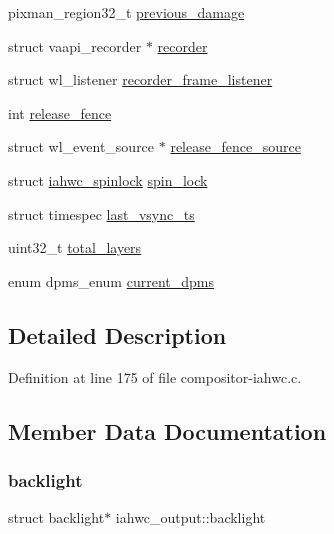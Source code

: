 \begin{DoxyCompactItemize}
\item 
pixman\+\_\+region32\+\_\+t \mbox{\hyperlink{structiahwc__output_a853f609b7a945b51ced6349755d9261c}{previous\+\_\+damage}}
\item 
struct vaapi\+\_\+recorder $\ast$ \mbox{\hyperlink{structiahwc__output_a3fe7dd1b11d07065ec10a0066bad6b0b}{recorder}}
\item 
struct wl\+\_\+listener \mbox{\hyperlink{structiahwc__output_a8d3cfee58372ebf417ed0e6b8ef08db1}{recorder\+\_\+frame\+\_\+listener}}
\item 
int \mbox{\hyperlink{structiahwc__output_a3137bfd94446ab2ee1cc823575894b2a}{release\+\_\+fence}}
\item 
struct wl\+\_\+event\+\_\+source $\ast$ \mbox{\hyperlink{structiahwc__output_a34dcb2b1a9089f0dcc5f36afb845e399}{release\+\_\+fence\+\_\+source}}
\item 
struct \mbox{\hyperlink{structiahwc__spinlock}{iahwc\+\_\+spinlock}} \mbox{\hyperlink{structiahwc__output_a4ba268dca4916063188a7ba33f2123cd}{spin\+\_\+lock}}
\item 
struct timespec \mbox{\hyperlink{structiahwc__output_aeb2dda1bb8a7ef76b2be89b059f3d524}{last\+\_\+vsync\+\_\+ts}}
\item 
uint32\+\_\+t \mbox{\hyperlink{structiahwc__output_a62bb8c46afae61d108af6c2f17cd6ff5}{total\+\_\+layers}}
\item 
enum dpms\+\_\+enum \mbox{\hyperlink{structiahwc__output_a20868af3c280be48cfcbf0b96b0ab67c}{current\+\_\+dpms}}
\end{DoxyCompactItemize}


\subsection{Detailed Description}


Definition at line 175 of file compositor-\/iahwc.\+c.



\subsection{Member Data Documentation}
\mbox{\label{structiahwc__output_a1ebafa94e848666e5f28c124d9b6b72e}} 
\subsubsection{\texorpdfstring{backlight}{backlight}}
{\footnotesize\ttfamily struct backlight$\ast$ iahwc\+\_\+output\+::backlight}




